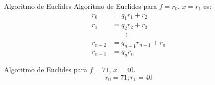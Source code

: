 \documentclass[10pt,t]{beamer}
\begin{document}
\begin{frame}
    \renewcommand{\arraystretch}{1.2}

    \begin{block}{\centering \large Algoritmo de Euclides}
        Algoritmo de Euclides para $f = r_0$, $x = r_1$ es:
        \vspace{-0.3em}
        \begin{align*}
            r_0 &= q_1r_1 + r_2 \\
            r_1 &= q_2r_2 + r_3 \\
            &\quad \quad\vdots  \\
            r_{n-2} &= q_{n-1}r_{n-1} + r_n\\
            r_{n-1} &= q_nr_n
        \end{align*} 
    \end{block}

    \begin{plainexample}
        \begin{center}
            \hspace{1.5em}
            Algoritmo de Euclides para $f = 71$, $x=40$. 
            \[r_0 = 71; r_1 = 40\]
        \end{center}
    \end{plainexample}
\end{frame}
\end{document}

